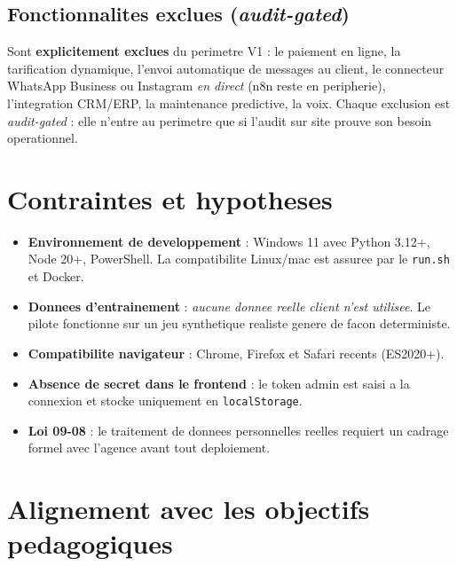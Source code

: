 \documentclass[12pt,a4paper,openany]{report}
\begin{document}
\subsection{Fonctionnalites exclues (\emph{audit-gated})}
Sont \textbf{explicitement exclues} du perimetre V1 : le paiement en ligne, la tarification dynamique, l'envoi automatique de messages au client, le connecteur WhatsApp Business ou Instagram \emph{en direct} (n8n reste en peripherie), l'integration CRM/ERP, la maintenance predictive, la voix. Chaque exclusion est \emph{audit-gated} : elle n'entre au perimetre que si l'audit sur site prouve son besoin operationnel.

\section{Contraintes et hypotheses}

\begin{itemize}[leftmargin=1.5cm]
\item \textbf{Environnement de developpement} : Windows 11 avec Python 3.12+, Node 20+, PowerShell. La compatibilite Linux/mac est assuree par le \texttt{run.sh} et Docker.
\item \textbf{Donnees d'entrainement} : \emph{aucune donnee reelle client n'est utilisee}. Le pilote fonctionne sur un jeu synthetique realiste genere de facon deterministe.
\item \textbf{Compatibilite navigateur} : Chrome, Firefox et Safari recents (ES2020+).
\item \textbf{Absence de secret dans le frontend} : le token admin est saisi a la connexion et stocke uniquement en \texttt{localStorage}.
\item \textbf{Loi 09-08} : le traitement de donnees personnelles reelles requiert un cadrage formel avec l'agence avant tout deploiement.
\end{itemize}

\section{Alignement avec les objectifs pedagogiques}
\end{document}

